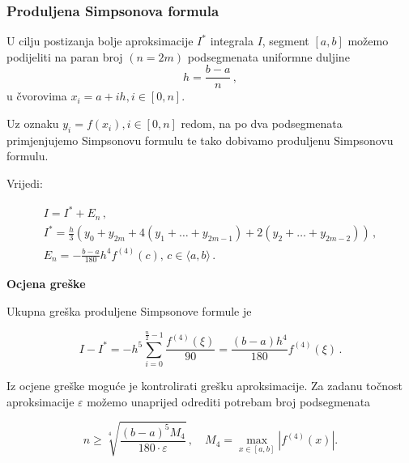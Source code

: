 \subsubsection{Produljena Simpsonova formula}

U cilju postizanja bolje aproksimacije $I^*$ integrala $I$, segment $[a,b]$
možemo podijeliti na paran broj $(n=2m)$ podsegmenata uniformne duljine
$$
h=\frac{b-a}{n}\,,
$$
u čvorovima $x_i=a+ih, i \in [0,n]$.

Uz oznaku $y_i=f(x_i), i \in [0,n]$ redom, na po dva podsegmenata primjenjujemo
Simpsonovu formulu te tako dobivamo produljenu Simpsonovu formulu.

Vrijedi:

\begin{gather*}
    I = I^* + E_n\,,\\
    I^* = \frac{h}{3}(y_0+y_{2m}+4(y_1+\dots+y_{2m-1})+2(y_2+\dots+y_{2m-2}))\,,\\
    E_n = -\frac{b-a}{180}h^4f^{(4)}(c),\, c\in\langle a, b \rangle \,.
\end{gather*}

\bigskip
\noindent
\textbf{Ocjena greške}

Ukupna greška produljene Simpsonove formule je

$$
I - I^* = -h^5\sum_{i=0}^{\frac{n}{2}-1}\frac{f^{(4)}(\xi)}{90} = \frac{(b-a)h^4}{180}f^{(4)}(\xi)\,.
$$

Iz ocjene greške moguće je kontrolirati grešku aproksimacije. Za zadanu točnost
aproksimacije $\varepsilon$ možemo unaprijed odrediti potrebam broj podsegmenata

$$
n\geq \sqrt[4]{\frac{(b-a)^5M_4}{180\cdot \varepsilon}}\,,\quad M_4 = \max_{x\in[a,b]}|f^{(4)}(x)|.
$$
